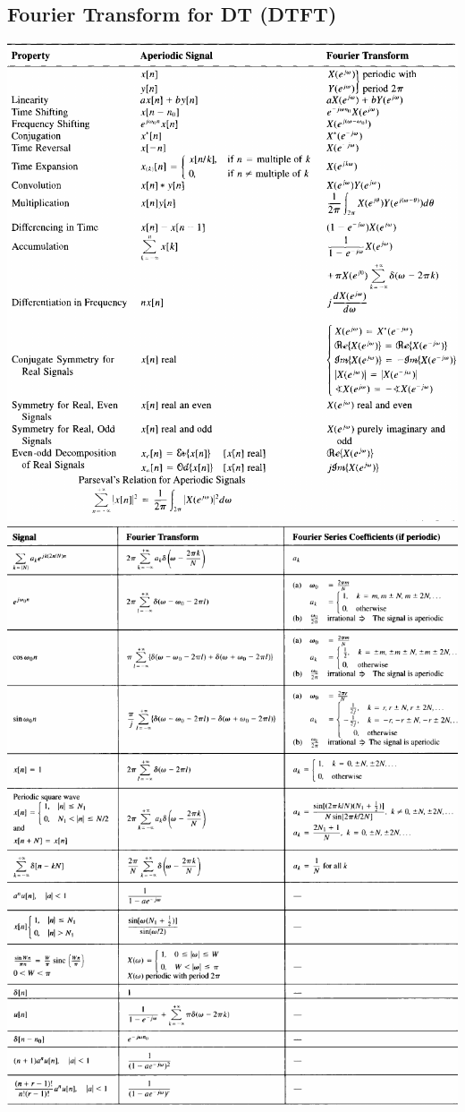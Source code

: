 \documentclass[]{article}
\begin{document}
\begin{multicols}{2}
    \section*{Fourier Transform for DT (DTFT)}
    \includegraphics[scale=0.4]{discrete1.png}
    \includegraphics[scale=0.5]{discrete2.png}


\end{multicols}
\end{document}
